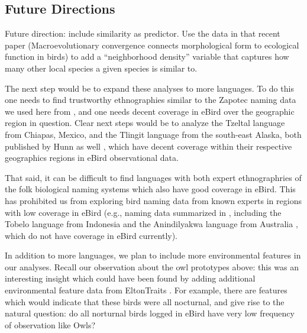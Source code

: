 \documentclass[10pt,letterpaper]{article}
\begin{document}

\subsection{Future Directions}

Future direction: include similarity as predictor. Use the data in that recent paper (Macroevolutionary convergence connects morphological form to ecological function in birds) to add a “neighborhood density” variable that captures how many other local species a given species is similar to.


The next step would be to expand these analyses to more languages. To do this one needs to find trustworthy ethnographies similar to the Zapotec naming data we used here from , and one needs decent coverage in eBird over the geographic region in question. Clear next steps would be to analyze the Tzeltal language from Chiapas, Mexico, and the Tlingit language from the south-east Alaska, both published by Hunn as well \cite{hunn1977tzeltal,hunn2012tlingit}, which have decent coverage within their respective geographics regions in eBird observational data. 

That said, it can be difficult to find languages with both expert ethnographries of the folk biological naming systems which also have good coverage in eBird. This has prohibited us from exploring bird naming data from known experts in regions with low coverage in eBird (e.g., naming data summarized in \cite{holman2002relation}, including the Tobelo language from Indonesia \cite{taylor1990folk} and the Anindilyakwa language from Australia \cite{waddy1988classification}, which do not have coverage in eBird currently).

In addition to more languages, we plan to include more environmental features in our analyses. Recall our observation about the owl prototypes above: this was an interesting insight which could have been found by adding additional environmental feature data from EltonTraits \cite{wilman2014eltontraits}. For example, there are features which would indicate that these birds were all nocturnal, and give rise to the natural question: do all norturnal birds logged in eBird have very low frequency of observation like Owls?
\end{document}
